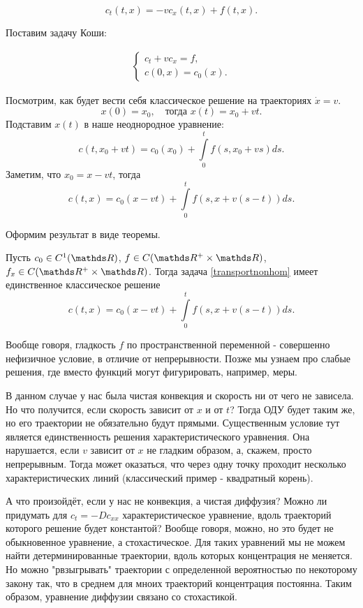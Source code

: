 $$ c_t (t, x) = - vc_x (t, x) + f(t, x). $$

Поставим задачу Коши:

\begin{align}
    \begin{cases} 
        c_t + v c_x = f, \\
        c (0, x) = c_0 (x).
    \end{cases}
\label{transportnonhom}
\end{align}

Посмотрим, как будет вести себя классическое решение на траекториях $ \dot x = v $.
\[
	x(0) = x_0,\quad \text{тогда } x(t) = x_0 + v t .
\]
Подставим $x(t)$ в наше неоднородное уравнение:
$$ c (t, x_0 + vt) = c_0 (x_0) + \int \limits_0^t f(s, x_0 + vs) ds. $$
Заметим, что $ x_0 = x - vt $, тогда
$$ c (t, x) = c_0 (x - vt) + \int \limits_0^t f(s, x + v(s-t)) ds. $$

Оформим результат  в виде теоремы.

\begin{theorem}
Пусть $c_0 \in C^1(\real)$, $f \in C (\real^+ \times \real)$, $f_x \in C (\real^+ \times \real)$. Тогда задача \eqref{transportnonhom} имеет единственное классическое решение $$ c (t, x) = c_0 (x - vt) + \int \limits_0^t f(s, x + v(s-t)) ds .$$
\end{theorem}

Вообще говоря, гладкость $f$ по пространственной переменной - совершенно нефизичное условие, в отличие от непрерывности. Позже мы узнаем про слабые решения, где вместо функций могут фигурировать, например, меры.

В данном случае у нас была чистая конвекция и скорость ни от чего не зависела. Но что получится, если скорость зависит от $x$ и от $t$? Тогда ОДУ будет таким же, но его траектории не обязательно будут прямыми. Существенным условие тут является единственность решения характеристического уравнения. Она нарушается, если $v$ зависит от $x$ не гладким образом, а, скажем, просто непрерывным. Тогда может оказаться, что через одну точку проходит несколько характеристических линий (классический пример - квадратный корень).

{\small А что произойдёт, если у нас не конвекция, а чистая диффузия? Можно ли придумать для $c_t = -Dc_{xx}$ характеристическое уравнение, вдоль траекторий которого решение будет константой? Вообще говоря, можно, но это будет не обыкновенное уравнение, а стохастическое. Для таких уравнений мы не можем найти детерминированные траектории, вдоль которых концентрация не меняется. Но можно "рвзыгрывать" траектории с определенной вероятностью по некоторому закону так, что в среднем для мноих траекторий концентрация постоянна. Таким образом, уравнение диффузии связано со стохастикой.}










